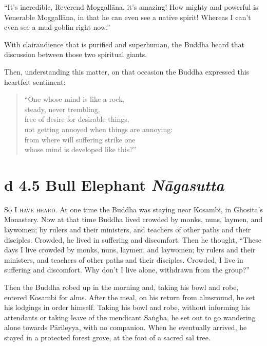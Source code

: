 \documentclass[12pt,openany]{book}%
\newcommand*{\suttatitleacronym}[1]{\smaller[2]{#1}\vspace*{.3em}}
\newcommand*{\suttatitletranslation}[1]{\linebreak{#1}}
\newcommand*{\suttatitleroot}[1]{\linebreak\smaller[2]\itshape{#1}}
\newcommand*{\tocacronym}[1]{\hspace*{-3.3em}{#1}\quad}
\newcommand*{\toctranslation}[1]{#1}
\newcommand*{\tocroot}[1]{(\textit{#1})}
\newcommand*{\scevam}[1]{\textsc{#1}}
\begin{document}
“It’s incredible, Reverend \textsanskrit{Moggallāna}, it’s amazing! How mighty and powerful is Venerable \textsanskrit{Moggallāna}, in that he can even see a native spirit! Whereas I can’t even see a mud-goblin right now.” 

With clairaudience that is purified and superhuman, the Buddha heard that discussion between those two spiritual giants. 

Then, understanding this matter, on that occasion the Buddha expressed this heartfelt sentiment: 

\begin{verse}%
“One whose mind is like a rock, \\
steady, never trembling, \\
free of desire for desirable things, \\
not getting annoyed when things are annoying: \\
from where will suffering strike one \\
whose mind is developed like this?” 

%
\end{verse}

%
\section*{{\suttatitleacronym Ud 4.5}{\suttatitletranslation A Bull Elephant }{\suttatitleroot Nāgasutta}}
\addcontentsline{toc}{section}{\tocacronym{Ud 4.5} \toctranslation{A Bull Elephant } \tocroot{Nāgasutta}}

\scevam{So I have heard. }At one time the Buddha was staying near Kosambi, in Ghosita’s Monastery. Now at that time Buddha lived crowded by monks, nuns, laymen, and laywomen; by rulers and their ministers, and teachers of other paths and their disciples. Crowded, he lived in suffering and discomfort. Then he thought, “These days I live crowded by monks, nuns, laymen, and laywomen; by rulers and their ministers, and teachers of other paths and their disciples. Crowded, I live in suffering and discomfort. Why don’t I live alone, withdrawn from the group?” 

Then the Buddha robed up in the morning and, taking his bowl and robe, entered Kosambi for alms. After the meal, on his return from almsround, he set his lodgings in order himself. Taking his bowl and robe, without informing his attendants or taking leave of the mendicant \textsanskrit{Saṅgha}, he set out to go wandering alone towards \textsanskrit{Pārileyya}, with no companion. When he eventually arrived, he stayed in a protected forest grove, at the foot of a sacred sal tree. 
\end{document}

